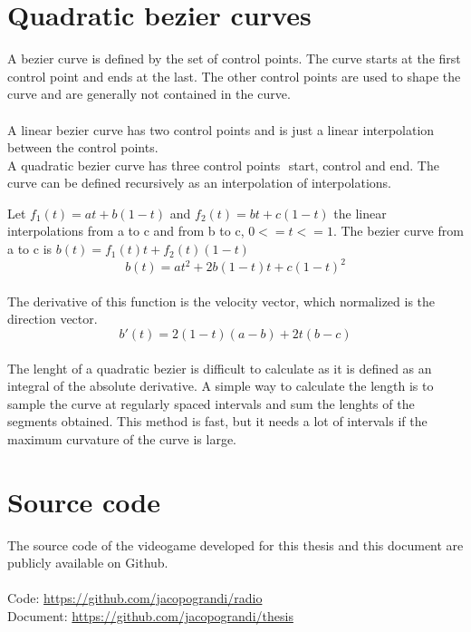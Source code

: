 \documentclass[12pt]{article}
\newcommand\blankpage{%
    \null
    \thispagestyle{empty}%
    \addtocounter{page}{-1}%
    \newpage}
\begin{document}
\begin{appendices}
\section{Quadratic bezier curves}
A bezier curve is defined by the set of control points. The curve starts at the first control point and ends at the last. The other control points are used to shape the curve and are generally not contained in the curve. \\
\\
A linear bezier curve has two control points and is just a linear interpolation between the control points. \\
A quadratic bezier curve has three control points \begin{math}[ a, b, c ]\end{math} start, control and end. The curve can be defined recursively as an interpolation of interpolations. 
 
\medskip

Let \begin{math}f_1(t) = at + b(1-t)\end{math} and \begin{math}f_2(t) = bt + c(1-t)\end{math} the linear interpolations from a to c and from b to c, \begin{math}0 <= t <= 1\end{math}.
The bezier curve from a to c is \begin{math}b(t) = f_1(t)t + f_2(t)(1-t)\end{math} \\
\begin{equation}b(t) = at^2 + 2b(1-t)t + c(1-t)^2\end{equation}
\\
The derivative of this function is the velocity vector, which normalized is the direction vector.
\begin{equation}b'(t) = 2(1-t)(a-b) + 2t(b-c)\end{equation}
\\
The lenght of a quadratic bezier is difficult to calculate as it is defined as an integral of the absolute derivative. A simple way to calculate the length is to sample the curve at regularly spaced intervals and sum the lenghts of the segments obtained. This method is fast, but it needs a lot of intervals if the maximum curvature of the curve is large.

\clearpage

\section{Source code}
The source code of the videogame developed for this thesis and this document are publicly available on Github. \\
\\
Code: \url{https://github.com/jacopograndi/radio} \\
Document: \url{https://github.com/jacopograndi/thesis} \\

\end{appendices}

\afterpage{\blankpage}

\clearpage



\end{document}
